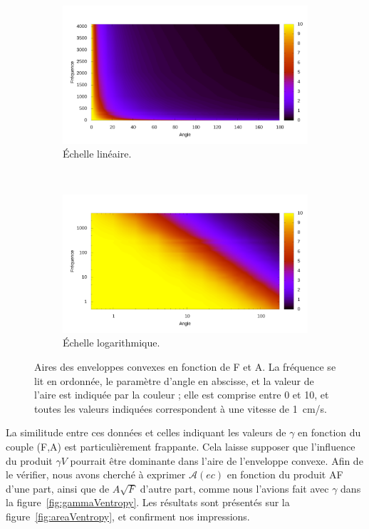 	\begin{figure}[!htb]
		\centering
		\begin{subfigure}[t]{\textwidth}
			\centering
			\includegraphics[width=\textwidth]{figures/ch4/afArea}
			\caption{Échelle linéaire.}
			\label{fig:afAreaLin}
		\end{subfigure}
		~
		\begin{subfigure}[t]{\textwidth}
			\centering
			\includegraphics[width=\textwidth]{figures/ch4/afArea_log}
			\caption{Échelle logarithmique.}
			\label{fig:afAreaLog}
		\end{subfigure}
		\caption[Aires des enveloppes convexes en fonction de F et A]{Aires des enveloppes convexes en fonction de F et A. La fréquence se lit en ordonnée, le paramètre d'angle en abscisse, et la valeur de l'aire est indiquée par la couleur ; elle est comprise entre 0 et 10, et toutes les valeurs indiquées correspondent à une vitesse de 1~cm/s.}
		\label{fig:afArea}
	\end{figure}
	
	La similitude entre ces données et celles indiquant les valeurs de $\gamma$ en fonction du couple (F,A) est particulièrement frappante. Cela laisse supposer que l'influence du produit $\gamma{}V$ pourrait être dominante dans l'aire de l'enveloppe convexe. Afin de le vérifier, nous avons cherché à exprimer $\mathcal{A}(ec)$ en fonction du produit AF d'une part, ainsi que de $A\sqrt{F}$ d'autre part, comme nous l'avions fait avec $\gamma$ dans la figure~\ref{fig:gammaVentropy}. Les résultats sont présentés sur la figure~\ref{fig:areaVentropy}, et confirment nos impressions.	
	
